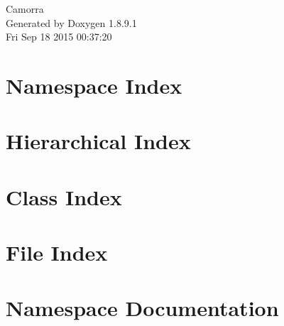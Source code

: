 \documentclass[twoside]{book}
\newcommand{\+}{\discretionary{\mbox{\scriptsize$\hookleftarrow$}}{}{}}
\newcommand{\clearemptydoublepage}{%
  \newpage{\pagestyle{empty}\cleardoublepage}%
}
\begin{document}
\hypersetup{pageanchor=false,
             bookmarks=true,
             bookmarksnumbered=true,
             pdfencoding=unicode
            }
\begin{titlepage}
\vspace*{7cm}
\begin{center}%
{\Large Camorra }\\
\vspace*{1cm}
{\large Generated by Doxygen 1.8.9.1}\\
\vspace*{0.5cm}
{\small Fri Sep 18 2015 00:37:20}\\
\end{center}
\end{titlepage}
\clearemptydoublepage
\tableofcontents
\clearemptydoublepage
{}
\hypersetup{pageanchor=true}

\chapter{Namespace Index}

\chapter{Hierarchical Index}

\chapter{Class Index}

\chapter{File Index}

\chapter{Namespace Documentation}


\end{document}
